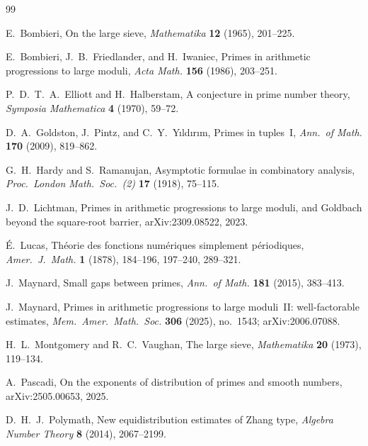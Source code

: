 \documentclass[12pt]{amsart}
\theoremstyle{plain}
\theoremstyle{definition}
\theoremstyle{remark}
\begin{document}
\begin{thebibliography}{99}


E.~Bombieri,
On the large sieve,
\emph{Mathematika} \textbf{12} (1965), 201--225.

E.~Bombieri, J.~B.~Friedlander, and H.~Iwaniec,
Primes in arithmetic progressions to large moduli,
\emph{Acta Math.} \textbf{156} (1986), 203--251.

P.~D.~T.~A.~Elliott and H.~Halberstam,
A conjecture in prime number theory,
\emph{Symposia Mathematica} \textbf{4} (1970), 59--72.

D.~A.~Goldston, J.~Pintz, and C.~Y.~Y{\i}ld{\i}r{\i}m,
Primes in tuples~I,
\emph{Ann.\ of Math.} \textbf{170} (2009), 819--862.

G.~H.~Hardy and S.~Ramanujan,
Asymptotic formulae in combinatory analysis,
\emph{Proc.\ London Math.\ Soc.\ (2)} \textbf{17} (1918), 75--115.

J.~D.~Lichtman,
Primes in arithmetic progressions to large moduli, and Goldbach beyond the
square-root barrier,
arXiv:2309.08522, 2023.

\'E.~Lucas,
Th\'eorie des fonctions num\'eriques simplement p\'eriodiques,
\emph{Amer.\ J.\ Math.} \textbf{1} (1878), 184--196, 197--240, 289--321.

J.~Maynard,
Small gaps between primes,
\emph{Ann.\ of Math.} \textbf{181} (2015), 383--413.

J.~Maynard,
Primes in arithmetic progressions to large moduli~II: well-factorable
estimates,
\emph{Mem.\ Amer.\ Math.\ Soc.} \textbf{306} (2025), no.~1543;
arXiv:2006.07088.

H.~L.~Montgomery and R.~C.~Vaughan,
The large sieve,
\emph{Mathematika} \textbf{20} (1973), 119--134.

A.~Pascadi,
On the exponents of distribution of primes and smooth numbers,
arXiv:2505.00653, 2025.

D.~H.~J.~Polymath,
New equidistribution estimates of Zhang type,
\emph{Algebra Number Theory} \textbf{8} (2014), 2067--2199.


\end{thebibliography}
\end{document}
